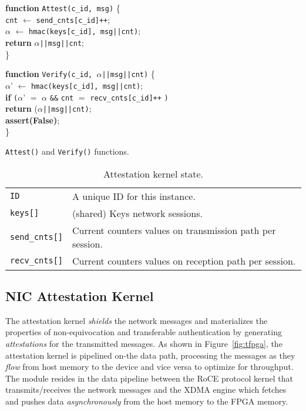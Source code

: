 \begin{algorithm}
\SetAlgoLined
\small
\textbf{function} \texttt{Attest(c\_id, msg)} \{ \\
\Indp
{\tt cnt} $\leftarrow$ {\tt send\_cnts[c\_id]++};\\
$\alpha$ $\leftarrow$ {\tt hmac(keys[c\_id], msg||cnt)}; \\
\textbf{return} $\alpha${\tt ||msg||cnt};\\
\Indm
\} \\


\vspace{0.3cm}

\textbf{function} \texttt{Verify(c\_id, $\alpha$||msg||cnt)} \{ \\
\Indp
    $\alpha$' $\leftarrow$ {\tt hmac(keys[c\_id], msg||cnt)};\\
    \textbf{if} {\tt (}$\alpha$' $=$ $\alpha$ {\tt \&\&} {\tt cnt} $=$ {\tt recv\_cnts[c\_id]++} {\tt )}\\
    \Indp
        \textbf{return} ($\alpha${\tt ||msg||cnt)}; \\
    \Indm
    \textbf{assert(False)}; \\
\Indm
\} \\
\vspace{-1pt}
\caption{\texttt{Attest()} and \texttt{Verify()} functions.}
\label{algo:primitives}
\end{algorithm}

\begin{center}
\begin{table}[ht]
\small
\centering
\begin{tabular}{ |m{2cm}||m{5.6cm}|}
 \hline
 {\tt ID} & A unique ID for this \projecttitle{} instance. \\
 {\tt keys[]} & (shared) Keys network sessions. \\
 {\tt send\_cnts[]} & Current counters values on transmission path per session.\\
 {\tt recv\_cnts[]} & Current counters values on reception path per session.\\
 \hline
 \end{tabular}
\caption{Attestation kernel state.}
\label{table:api}
\end{table}
\end{center}
\fi 

\subsection{NIC Attestation Kernel}
\label{subsec:nic_attest_kernel}
 The attestation kernel {\em shields} the network messages and materializes the properties of non-equivocation and transferable authentication by generating {\em attestations} for the transmitted messages. As shown in Figure~\ref{fig:tfpga}, the attestation kernel is pipelined on-the data path, processing the messages as they {\em flow} from host memory to the device and vice versa to optimize for throughput. The module resides in the data pipeline between the RoCE protocol kernel that transmits/receives the network messages and the XDMA engine which fetches and pushes data {\em asynchronously} from the host memory to the FPGA memory.


